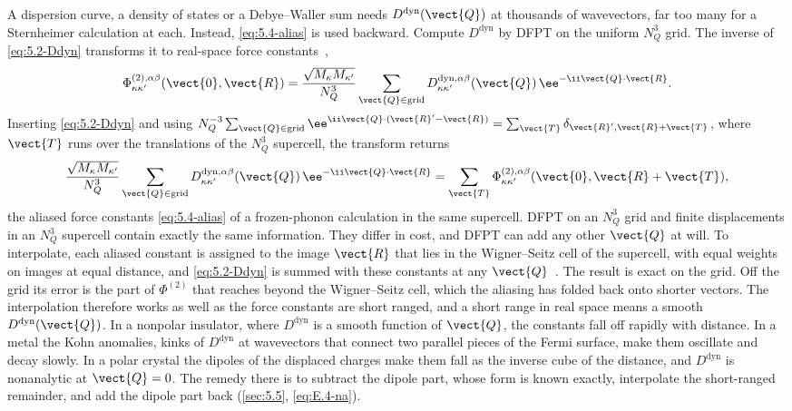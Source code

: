 A dispersion curve, a density of states or a Debye--Waller sum needs $D^{\mathrm{dyn}}(\vect{Q})$ at thousands of wavevectors, far too many for a Sternheimer calculation at each. Instead, \cref{eq:5.4-alias} is used backward. Compute $D^{\mathrm{dyn}}$ by DFPT on the uniform $N_Q^3$ grid. The inverse of \cref{eq:5.2-Ddyn} transforms it to real-space force constants~\cite[Eq.~(99)]{baroni2001phonons},
\begin{equation}
  \Phi^{(2),\alpha\beta}_{\kappa\kappa'}(\vect{0},\vect{R}) = \frac{\sqrt{M_\kappa M_{\kappa'}}}{N_Q^3}\sum_{\vect{Q}\in\mathrm{grid}} D^{\mathrm{dyn},\alpha\beta}_{\kappa\kappa'}(\vect{Q})\,\ee^{-\ii\vect{Q}\cdot\vect{R}} .
  \label{eq:E.4-ifc}
\end{equation}
Inserting \cref{eq:5.2-Ddyn} and using $N_Q^{-3}\sum_{\vect{Q}\in\mathrm{grid}}\ee^{\ii\vect{Q}\cdot(\vect{R}'-\vect{R})} = \sum_{\vect{T}}\delta_{\vect{R}',\vect{R}+\vect{T}}$, where $\vect{T}$ runs over the translations of the $N_Q^3$ supercell, the transform returns
\begin{equation*}
  \frac{\sqrt{M_\kappa M_{\kappa'}}}{N_Q^3}\sum_{\vect{Q}\in\mathrm{grid}}D^{\mathrm{dyn},\alpha\beta}_{\kappa\kappa'}(\vect{Q})\,\ee^{-\ii\vect{Q}\cdot\vect{R}}
  = \sum_{\vect{T}}\Phi^{(2),\alpha\beta}_{\kappa\kappa'}(\vect{0},\vect{R}+\vect{T}) ,
\end{equation*}
the aliased force constants \cref{eq:5.4-alias} of a frozen-phonon calculation in the same supercell. DFPT on an $N_Q^3$ grid and finite displacements in an $N_Q^3$ supercell contain exactly the same information. They differ in cost, and DFPT can add any other $\vect{Q}$ at will. To interpolate, each aliased constant is assigned to the image $\vect{R}$ that lies in the Wigner--Seitz cell of the supercell, with equal weights on images at equal distance, and \cref{eq:5.2-Ddyn} is summed with these constants at any $\vect{Q}$~\cite[Sect.~II.D.3]{baroni2001phonons}. The result is exact on the grid. Off the grid its error is the part of $\Phi^{(2)}$ that reaches beyond the Wigner--Seitz cell, which the aliasing has folded back onto shorter vectors. The interpolation therefore works as well as the force constants are short ranged, and a short range in real space means a smooth $D^{\mathrm{dyn}}(\vect{Q})$. In a nonpolar insulator, where $D^{\mathrm{dyn}}$ is a smooth function of $\vect{Q}$, the constants fall off rapidly with distance. In a metal the Kohn anomalies, kinks of $D^{\mathrm{dyn}}$ at wavevectors that connect two parallel pieces of the Fermi surface, make them oscillate and decay slowly. In a polar crystal the dipoles of the displaced charges make them fall as the inverse cube of the distance, and $D^{\mathrm{dyn}}$ is nonanalytic at $\vect{Q} = 0$. The remedy there is to subtract the dipole part, whose form is known exactly, interpolate the short-ranged remainder, and add the dipole part back (\cref{sec:5.5}, \cref{eq:E.4-na}).

